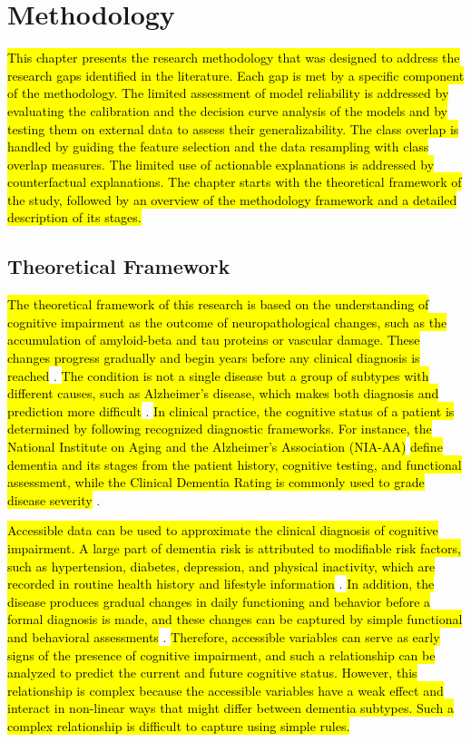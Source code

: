 \chapter{Methodology}

\hspace{12.7mm}\hl{This chapter presents the research methodology that was designed to address the research gaps identified in the literature. Each gap is met by a specific component of the methodology. The limited assessment of model reliability is addressed by evaluating the calibration and the decision curve analysis of the models and by testing them on external data to assess their generalizability. The class overlap is handled by guiding the feature selection and the data resampling with class overlap measures. The limited use of actionable explanations is addressed by counterfactual explanations. The chapter starts with the theoretical framework of the study, followed by an overview of the methodology framework and a detailed description of its stages.}

\section{Theoretical Framework}
\hl{The theoretical framework of this research is based on the understanding of cognitive impairment as the outcome of neuropathological changes, such as the accumulation of amyloid-beta and tau proteins or vascular damage. These changes progress gradually and begin years before any clinical diagnosis is reached} \cite{Beason-Held2013Changes}. \hl{The condition is not a single disease but a group of subtypes with different causes, such as Alzheimer's disease, which makes both diagnosis and prediction more difficult} \cite{Scheltens2021Alzheimer}. \hl{In clinical practice, the cognitive status of a patient is determined by following recognized diagnostic frameworks. For instance, the National Institute on Aging and the Alzheimer's Association (NIA-AA)} \cite{Besser2018Version} \hl{define dementia and its stages from the patient history, cognitive testing, and functional assessment, while the Clinical Dementia Rating is commonly used to grade disease severity} \cite{Morris1993Clinical}.

\hl{Accessible data can be used to approximate the clinical diagnosis of cognitive impairment. A large part of dementia risk is attributed to modifiable risk factors, such as hypertension, diabetes, depression, and physical inactivity, which are recorded in routine health history and lifestyle information} \cite{Livingston2020Dementia}. \hl{In addition, the disease produces gradual changes in daily functioning and behavior before a formal diagnosis is made, and these changes can be captured by simple functional and behavioral assessments} \cite{Beason-Held2013Changes}. \hl{Therefore, accessible variables can serve as early signs of the presence of cognitive impairment, and such a relationship can be analyzed to predict the current and future cognitive status. However, this relationship is complex because the accessible variables have a weak effect and interact in non-linear ways that might differ between dementia subtypes. Such a complex relationship is difficult to capture using simple rules.} 

